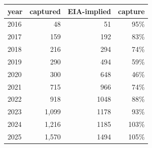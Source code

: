 \begin{tabular}{lrrr}
\toprule
year & captured & EIA-implied & capture \\
\midrule
  2016 & 48 & 51 & 95\% \\
  2017 & 159 & 192 & 83\% \\
  2018 & 216 & 294 & 74\% \\
  2019 & 290 & 494 & 59\% \\
  2020 & 300 & 648 & 46\% \\
  2021 & 715 & 966 & 74\% \\
  2022 & 918 & 1048 & 88\% \\
  2023 & 1,099 & 1178 & 93\% \\
  2024 & 1,216 & 1185 & 103\% \\
  2025 & 1,570 & 1494 & 105\% \\
\bottomrule
\end{tabular}
